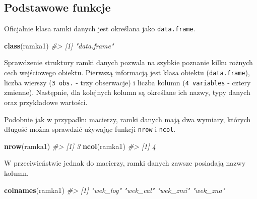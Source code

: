 \documentclass[paper=6in:9in,pagesize=pdftex,headinclude=on,footinclude=on,10pt]{scrbook}
\newenvironment{Shaded}{\begin{snugshade}}{\end{snugshade}}
\newcommand{\CommentTok}[1]{\textcolor[rgb]{0.56,0.35,0.01}{\textit{#1}}}
\newcommand{\KeywordTok}[1]{\textcolor[rgb]{0.13,0.29,0.53}{\textbf{#1}}}
\newcommand{\NormalTok}[1]{#1}
\begin{document}
\hypertarget{podstawowe-funkcje-1}{%
\subsection{Podstawowe funkcje}\label{podstawowe-funkcje-1}}

Oficjalnie klasa ramki danych jest określana jako \texttt{data.frame}.

\begin{Shaded}
\begin{Highlighting}[]
\KeywordTok{class}\NormalTok{(ramka1)}
\CommentTok{#> [1] "data.frame"}
\end{Highlighting}
\end{Shaded}

Sprawdzenie struktury ramki danych pozwala na szybkie poznanie kilku rożnych cech wejściowego obiektu.
Pierwszą informacją jest klasa obiektu (\texttt{data.frame}), liczba wierszy (\texttt{3\ obs.} - trzy obserwacje) i liczba kolumn (\texttt{4\ variables} - cztery zmienne).
Następnie, dla kolejnych kolumn są określane ich nazwy, typy danych oraz przykładowe wartości.

\begin{Shaded}
\end{Shaded}

Podobnie jak w przypadku macierzy, ramki danych mają dwa wymiary, których długość można sprawdzić używając funkcji \texttt{nrow} i \texttt{ncol}.

\begin{Shaded}
\begin{Highlighting}[]
\KeywordTok{nrow}\NormalTok{(ramka1)}
\CommentTok{#> [1] 3}
\KeywordTok{ncol}\NormalTok{(ramka1)}
\CommentTok{#> [1] 4}
\end{Highlighting}
\end{Shaded}

W przeciwieństwie jednak do macierzy, ramki danych zawsze posiadają nazwy kolumn.

\begin{Shaded}
\begin{Highlighting}[]
\KeywordTok{colnames}\NormalTok{(ramka1)}
\CommentTok{#> [1] "wek_log" "wek_cal" "wek_zmi" "wek_zna"}
\end{Highlighting}
\end{Shaded}
\end{document}
